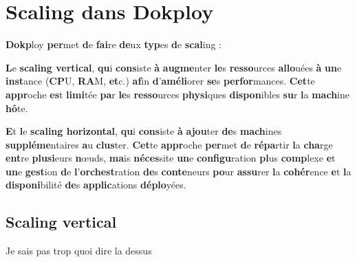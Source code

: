 \documentclass{rapportClass} %
\begin{document}
\section{Scaling dans Dokploy}
\textbf{Dokp}loy \textbf{per}met \textbf{d}e \textbf{fai}re \textbf{de}ux \textbf{typ}es \textbf{d}e \textbf{scal}ing : 

\textbf{L}e \textbf{\textbf{scal}ing \textbf{vert}ical}, \textbf{qu}i \textbf{cons}iste \textbf{à} \textbf{augme}nter \textbf{le}s \textbf{resso}urces \textbf{allo}uées \textbf{à} \textbf{un}e \textbf{inst}ance (\textbf{CP}U, \textbf{RA}M, \textbf{et}c.) 
\textbf{af}in \textbf{d}'\textbf{améli}orer \textbf{se}s \textbf{perfor}mances. \textbf{Cet}te \textbf{appr}oche \textbf{es}t \textbf{limi}tée \textbf{pa}r \textbf{le}s \textbf{resso}urces \textbf{physi}ques \textbf{dispon}ibles \textbf{su}r 
\textbf{l}a \textbf{mach}ine \textbf{hô}te.

\textbf{E}t \textbf{l}e \textbf{\textbf{scal}ing \textbf{horiz}ontal}, \textbf{qu}i \textbf{cons}iste \textbf{à} \textbf{ajou}ter \textbf{de}s \textbf{mach}ines \textbf{suppléme}ntaires \textbf{a}u \textbf{clus}ter.
\textbf{Cet}te \textbf{appr}oche \textbf{per}met \textbf{d}e \textbf{répa}rtir \textbf{l}a \textbf{cha}rge \textbf{ent}re \textbf{plusi}eurs \textbf{n}œuds, \textbf{ma}is \textbf{néces}site \textbf{un}e \textbf{configu}ration \textbf{pl}us \textbf{comp}lexe \textbf{e}t \textbf{un}e 
\textbf{gest}ion \textbf{d}e \textbf{l}'\textbf{orchest}ration \textbf{de}s \textbf{conte}neurs \textbf{po}ur \textbf{assu}rer \textbf{l}a \textbf{cohér}ence \textbf{e}t \textbf{l}a \textbf{disponi}bilité \textbf{de}s \textbf{applic}ations \textbf{déplo}yées.

\subsection{Scaling vertical} 
{\color{blue}Je sais pas trop quoi dire la dessus}
\end{document}
